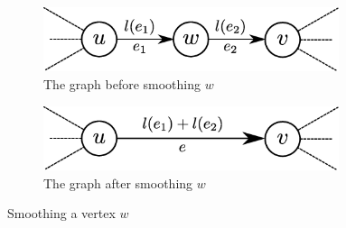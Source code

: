 \begin{figure}[htbp]
    \centering
    \begin{subfigure}[htbp]{0.45\textwidth}
        \centering
        \includegraphics[width=0.95\textwidth]{Content/Pictures/Fig4a.eps}
        \caption{The graph before smoothing $w$}
    \end{subfigure}
    \hfill
    \begin{subfigure}[htbp]{0.45\textwidth}
        \centering
        \includegraphics[width=0.95\textwidth]{Content/Pictures/Fig4b.eps}
        \caption{The graph after smoothing $w$}
    \end{subfigure}
    \caption{Smoothing a vertex $w$}
    \label{fig:smoothing}
\end{figure}

